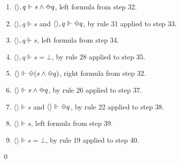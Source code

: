 \begin{myEx}
\begin{enumerate}
\item $\langle \rangle, q \Vdash s \land \LTLonce q$, left formula from step 32.\\ %

\item $\langle \rangle, q \Vdash s$ and $\langle \rangle, q \Vdash \LTLonce q$, by rule 31 applied to step 33.\\ %

\item $\langle \rangle, q \Vdash s$, left formula from step 34.\\ %

\item $\langle \rangle, q \Vdash s = \bot$, by rule 28 applied to step 35.\\ %

\item $\langle \rangle \Vdash \LTLonce(s \land \LTLonce q)$, right formula from step 32.\\ %

\item $\langle \rangle \Vdash s \land \LTLonce q$, by rule 26 applied to step 37.\\ %

\item $\langle \rangle \Vdash s$ and $\langle \rangle \Vdash \LTLonce q$, by rule 22 applied to step 38.\\ %

\item $\langle \rangle \Vdash s$, left formula from step 39.\\ %

\item $\langle \rangle \Vdash s = \bot$, by rule 19 applied to step 40.\\ %
\end{enumerate}
\qed
\end{myEx}

